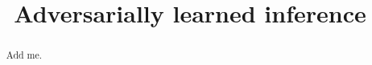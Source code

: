 \documentclass{article}
\title{Adversarially learned inference}
\begin{document}
\maketitle

\begin{abstract}
    Add me.
\end{abstract}
\end{document}
